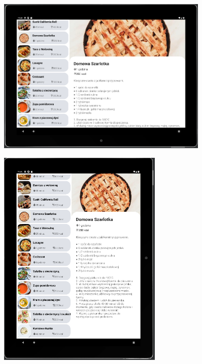 \documentclass{article}
\begin{document}
\begin{enumerate}
\begin{enumerate}
\newpage
\begin{figure}[ht]
    \centering
    \includegraphics[width=0.9\textwidth]{../res/tablet_recipe_horizontal}
\end{figure}

\newpage
\begin{figure}[ht]
    \centering
    \includegraphics[width=0.7\textwidth]{../res/tablet_recipe_vertical}
\end{figure}

\end{enumerate}
\newpage


\end{enumerate}
\end{document}
